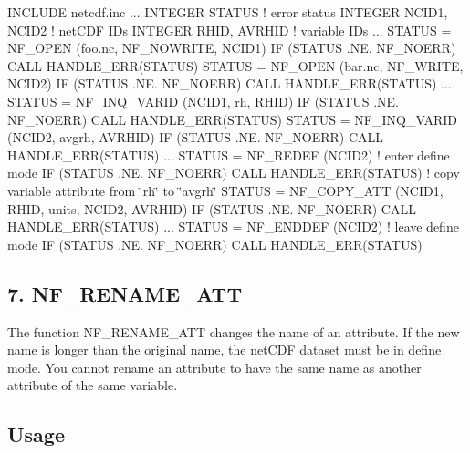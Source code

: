 I\+N\+C\+L\+U\+DE \textquotesingle{}netcdf.\+inc\textquotesingle{} ... I\+N\+T\+E\+G\+ER S\+T\+A\+T\+US ! error status I\+N\+T\+E\+G\+ER N\+C\+I\+D1, N\+C\+I\+D2 ! net\+C\+DF I\+Ds I\+N\+T\+E\+G\+ER R\+H\+ID, A\+V\+R\+H\+ID ! variable I\+Ds ... S\+T\+A\+T\+US = N\+F\+\_\+\+O\+P\+EN (\textquotesingle{}foo.\+nc\textquotesingle{}, N\+F\+\_\+\+N\+O\+W\+R\+I\+TE, N\+C\+I\+D1) IF (S\+T\+A\+T\+US .NE. N\+F\+\_\+\+N\+O\+E\+RR) C\+A\+LL H\+A\+N\+D\+L\+E\+\_\+\+E\+R\+R(\+S\+T\+A\+T\+U\+S) S\+T\+A\+T\+US = N\+F\+\_\+\+O\+P\+EN (\textquotesingle{}bar.\+nc\textquotesingle{}, N\+F\+\_\+\+W\+R\+I\+TE, N\+C\+I\+D2) IF (S\+T\+A\+T\+US .NE. N\+F\+\_\+\+N\+O\+E\+RR) C\+A\+LL H\+A\+N\+D\+L\+E\+\_\+\+E\+R\+R(\+S\+T\+A\+T\+U\+S) ... S\+T\+A\+T\+US = N\+F\+\_\+\+I\+N\+Q\+\_\+\+V\+A\+R\+ID (N\+C\+I\+D1, \textquotesingle{}rh\textquotesingle{}, R\+H\+ID) IF (S\+T\+A\+T\+US .NE. N\+F\+\_\+\+N\+O\+E\+RR) C\+A\+LL H\+A\+N\+D\+L\+E\+\_\+\+E\+R\+R(\+S\+T\+A\+T\+U\+S) S\+T\+A\+T\+US = N\+F\+\_\+\+I\+N\+Q\+\_\+\+V\+A\+R\+ID (N\+C\+I\+D2, \textquotesingle{}avgrh\textquotesingle{}, A\+V\+R\+H\+ID) IF (S\+T\+A\+T\+US .NE. N\+F\+\_\+\+N\+O\+E\+RR) C\+A\+LL H\+A\+N\+D\+L\+E\+\_\+\+E\+R\+R(\+S\+T\+A\+T\+U\+S) ... S\+T\+A\+T\+US = N\+F\+\_\+\+R\+E\+D\+EF (N\+C\+I\+D2) ! enter define mode IF (S\+T\+A\+T\+US .NE. N\+F\+\_\+\+N\+O\+E\+RR) C\+A\+LL H\+A\+N\+D\+L\+E\+\_\+\+E\+R\+R(\+S\+T\+A\+T\+U\+S) ! copy variable attribute from \char`\"{}rh\char`\"{} to \char`\"{}avgrh\char`\"{} S\+T\+A\+T\+US = N\+F\+\_\+\+C\+O\+P\+Y\+\_\+\+A\+TT (N\+C\+I\+D1, R\+H\+ID, \textquotesingle{}units\textquotesingle{}, N\+C\+I\+D2, A\+V\+R\+H\+ID) IF (S\+T\+A\+T\+US .NE. N\+F\+\_\+\+N\+O\+E\+RR) C\+A\+LL H\+A\+N\+D\+L\+E\+\_\+\+E\+R\+R(\+S\+T\+A\+T\+U\+S) ... S\+T\+A\+T\+US = N\+F\+\_\+\+E\+N\+D\+D\+EF (N\+C\+I\+D2) ! leave define mode IF (S\+T\+A\+T\+US .NE. N\+F\+\_\+\+N\+O\+E\+RR) C\+A\+LL H\+A\+N\+D\+L\+E\+\_\+\+E\+R\+R(\+S\+T\+A\+T\+U\+S)

\subsection*{7. N\+F\+\_\+\+R\+E\+N\+A\+M\+E\+\_\+\+A\+TT }

The function N\+F\+\_\+\+R\+E\+N\+A\+M\+E\+\_\+\+A\+TT changes the name of an attribute. If the new name is longer than the original name, the net\+C\+DF dataset must be in define mode. You cannot rename an attribute to have the same name as another attribute of the same variable.

\subsection*{Usage }

